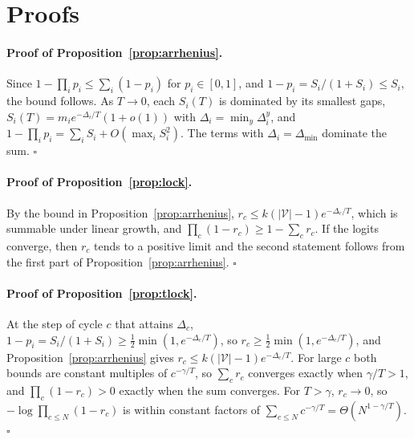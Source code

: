 \section{Proofs}
\label{app:proofs}

\paragraph{Proof of Proposition~\ref{prop:arrhenius}.}
Since $1-\prod_i p_i\le\sum_i (1-p_i)$ for $p_i\in[0,1]$, and $1-p_i=S_i/(1+S_i)\le S_i$, the bound follows. As $T\to0$, each $S_i(T)$ is dominated by its smallest gaps, $S_i(T)=m_i e^{-\Delta_i/T}(1+o(1))$ with $\Delta_i=\min_y\Delta_i^y$, and $1-\prod_i p_i=\sum_i S_i+O(\max_i S_i^2)$. The terms with $\Delta_i=\Delta_{\min}$ dominate the sum.
 $\square$

\paragraph{Proof of Proposition~\ref{prop:lock}.}
By the bound in Proposition~\ref{prop:arrhenius}, $r_c\le k(|\mathcal V|-1)e^{-\Delta_c/T}$, which is summable under linear growth, and $\prod_c(1-r_c)\ge1-\sum_c r_c$. If the logits converge, then $r_c$ tends to a positive limit and the second statement follows from the first part of Proposition~\ref{prop:arrhenius}.
 $\square$

\paragraph{Proof of Proposition~\ref{prop:tlock}.}
At the step of cycle $c$ that attains $\Delta_c$, $1-p_i=S_i/(1+S_i)\ge\tfrac12\min(1,e^{-\Delta_c/T})$, so $r_c\ge\tfrac12\min(1,e^{-\Delta_c/T})$, and Proposition~\ref{prop:arrhenius} gives $r_c\le k(|\mathcal V|-1)e^{-\Delta_c/T}$. For large $c$ both bounds are constant multiples of $c^{-\gamma/T}$, so $\sum_c r_c$ converges exactly when $\gamma/T>1$, and $\prod_c(1-r_c)>0$ exactly when the sum converges. For $T>\gamma$, $r_c\to0$, so $-\log\prod_{c\le N}(1-r_c)$ is within constant factors of $\sum_{c\le N}c^{-\gamma/T}=\Theta(N^{1-\gamma/T})$.
 $\square$


